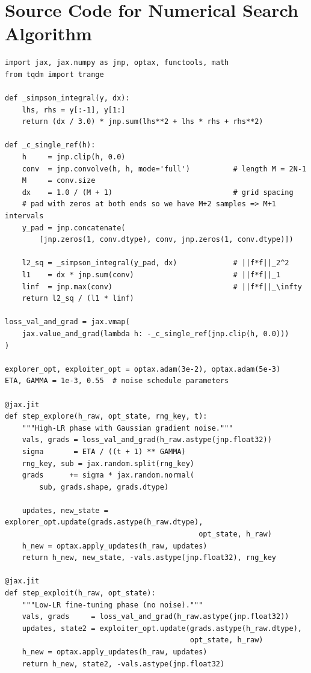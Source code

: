 \documentclass[11pt]{article}
\theoremstyle{definition}
\theoremstyle{remark}
\begin{document}
\pagebreak
\section{Source Code for Numerical Search Algorithm}\label{app:code}

\begin{lstlisting}[label={lst:gstep}]
import jax, jax.numpy as jnp, optax, functools, math
from tqdm import trange

def _simpson_integral(y, dx):
    lhs, rhs = y[:-1], y[1:]
    return (dx / 3.0) * jnp.sum(lhs**2 + lhs * rhs + rhs**2)

def _c_single_ref(h):
    h     = jnp.clip(h, 0.0)
    conv  = jnp.convolve(h, h, mode='full')          # length M = 2N-1
    M     = conv.size
    dx    = 1.0 / (M + 1)                            # grid spacing
    # pad with zeros at both ends so we have M+2 samples => M+1 intervals
    y_pad = jnp.concatenate(
        [jnp.zeros(1, conv.dtype), conv, jnp.zeros(1, conv.dtype)])

    l2_sq = _simpson_integral(y_pad, dx)             # ||f*f||_2^2
    l1    = dx * jnp.sum(conv)                       # ||f*f||_1
    linf  = jnp.max(conv)                            # ||f*f||_\infty
    return l2_sq / (l1 * linf)

loss_val_and_grad = jax.vmap(
    jax.value_and_grad(lambda h: -_c_single_ref(jnp.clip(h, 0.0)))
)

explorer_opt, exploiter_opt = optax.adam(3e-2), optax.adam(5e-3)
ETA, GAMMA = 1e-3, 0.55  # noise schedule parameters

@jax.jit
def step_explore(h_raw, opt_state, rng_key, t):
    """High-LR phase with Gaussian gradient noise."""
    vals, grads = loss_val_and_grad(h_raw.astype(jnp.float32))
    sigma       = ETA / ((t + 1) ** GAMMA)
    rng_key, sub = jax.random.split(rng_key)
    grads      += sigma * jax.random.normal(
        sub, grads.shape, grads.dtype)

    updates, new_state = explorer_opt.update(grads.astype(h_raw.dtype),
                                             opt_state, h_raw)
    h_new = optax.apply_updates(h_raw, updates)
    return h_new, new_state, -vals.astype(jnp.float32), rng_key

@jax.jit
def step_exploit(h_raw, opt_state):
    """Low-LR fine-tuning phase (no noise)."""
    vals, grads     = loss_val_and_grad(h_raw.astype(jnp.float32))
    updates, state2 = exploiter_opt.update(grads.astype(h_raw.dtype),
                                           opt_state, h_raw)
    h_new = optax.apply_updates(h_raw, updates)
    return h_new, state2, -vals.astype(jnp.float32)
\end{lstlisting}
\end{document}
